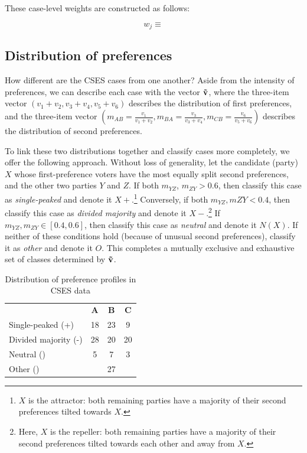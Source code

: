 \documentclass[12pt, letter]{article}
\begin{document}
These case-level weights are constructed as follows:

\begin{equation}
	w_j \equiv
\end{equation}

\subsection{Distribution of preferences} 

How different are the CSES cases from one another? Aside from the intensity of preferences, we can describe each case with the vector $\bf \tilde{v}$, where the three-item vector $(v_1 + v_2, v_3 + v_4, v_5 + v_6)$ describes the distribution of first preferences, and the three-item vector $(m_{AB} = \frac{v_1}{v_1 + v_2}, m_{BA} = \frac{v_3}{v_3 + v_4}, m_{CB} = \frac{v_6}{v_5 + v_6})$ describes the distribution of second preferences. 

To link these two distributions together and classify cases more completely, we offer the following approach. Without loss of generality, let the candidate (party) $X$ whose first-preference voters have the most equally split second preferences, and the other two parties $Y$ and $Z$. If both $m_{YZ}$, $m_{ZY} > 0.6$, then classify this case as \emph{single-peaked} and denote it $X+$.\footnote{$X$ is the attractor: both remaining parties have a majority of their second preferences tilted towards $X$.} Conversely, if both $m_{YZ}, m{ZY} < 0.4$, then classify this case as \emph{divided majority} and denote it $X-$.\footnote{Here, $X$ is the repeller: both remaining parties have a majority of their second preferences tilted towards each other and away from $X$.} If $m_{YZ}, m_{ZY} \in [0.4, 0.6]$, then classify this case as \emph{neutral} and denote it $N(X)$. If neither of these conditions hold (because of unusual second preferences), classify it as \emph{other} and denote it $O$. This completes a mutually exclusive and exhaustive set of classes determined by $\bf \tilde{v}$.

\begin{table}[tb]
	\caption{Distribution of preference profiles in CSES data}
	\label{tab:csesprefs}
	\centering

	\begin{tabular}{lccc}
	\hline

	\toprule
	\textbf{} & \textbf{A} & \textbf{B} & \textbf{C} \\
	\cmidrule{2-4}
	Single-peaked (+) & 18 & 23 & 9  \\
	Divided majority (-) & 28 & 20 & 20  \\
	Neutral () & 5 & 7 & 3  \\
	Other () & & 27 &  \\
	\bottomrule
	\end{tabular}
\end{table}
\end{document}
